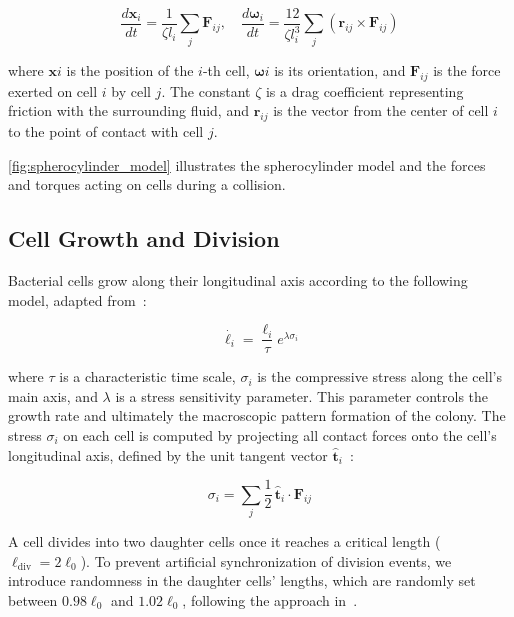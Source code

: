 \documentclass[conference]{IEEEtran}
\begin{document}
\begin{equation} \label{eq:overdamped_langevin}
    \frac{d \mathbf{x}_i}{dt} = \frac{1}{\zeta l_i} \sum_j \mathbf{F}_{ij}, \quad \frac{d \boldsymbol{\omega}_i}{dt} = \frac{12}{\zeta l_i^3} \sum_j (\mathbf{r}_{ij} \times \mathbf{F}_{ij})
\end{equation}

where $\mathbf{x}i$ is the position of the $i$-th cell, $\boldsymbol{\omega}i$ is its orientation, and $\mathbf{F}_{ij}$ is the force exerted on cell $i$ by cell $j$. The constant $\zeta$ is a drag coefficient representing friction with the surrounding fluid, and $\mathbf{r}_{ij}$ is the vector from the center of cell $i$ to the point of contact with cell $j$.

\autoref{fig:spherocylinder_model} illustrates the spherocylinder model and the forces and torques acting on cells during a collision.


\subsection{Cell Growth and Division}

Bacterial cells grow along their longitudinal axis according to the following model, adapted from~\cite{Weady2024}:

\begin{equation} \label{eq:growth}
    \dot{{\ell_i}} = \frac{{\ell_i}}{\tau} e^{\lambda \sigma_i}
\end{equation}

where $\tau$ is a characteristic time scale, $\sigma_i$ is the compressive stress along the cell's main axis, and $\lambda$ is a stress sensitivity parameter. This parameter controls the growth rate and ultimately the macroscopic pattern formation of the colony. The stress $\sigma_i$ on each cell is computed by projecting all contact forces onto the cell's longitudinal axis, defined by the unit tangent vector $\hat{\mathbf{t}}_i$~\cite{Weady2024}:

\begin{equation} \label{eq:stress}
    \sigma_i = \sum_{j} \frac{1}{2}\, \hat{\mathbf t}_i \cdot \mathbf F_{ij}
\end{equation}


A cell divides into two daughter cells once it reaches a critical length ($\ell_\text{div} = 2\ell_0$). To prevent artificial synchronization of division events, we introduce randomness in the daughter cells' lengths, which are randomly set between $0.98\ell_0$ and $1.02\ell_0$, following the approach in~\cite{Khan_2024}.
\end{document}
